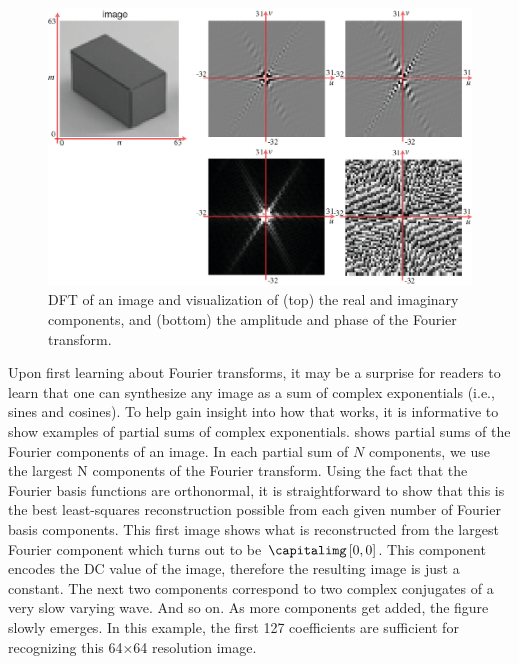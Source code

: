\begin{figure}[t]
	\centerline{
		\includegraphics[width=1\linewidth]{figures/Image_processing_fourier/dft_a.eps}
	}
	\caption{DFT of an image and visualization of (top) the real and imaginary components,
		and (bottom) the amplitude and phase  of the Fourier transform.}
	\label{fig:DFT_a}
\end{figure}

Upon first learning about Fourier transforms, it may be a surprise for readers to learn that one can synthesize any image as a sum of complex exponentials (i.e., sines and cosines).  To help gain insight into how that works, it is informative to show examples of partial sums of complex exponentials. \Fig{\ref{fig:DFT_b}} shows partial sums of the Fourier components
of an image.  In each partial sum of $N$ components, we use the largest N components of the Fourier transform.
Using the fact that the Fourier basis functions are orthonormal, it is straightforward to show that this is the best least-squares reconstruction possible from each given number of Fourier basis
components.  This first image shows what is reconstructed from the largest Fourier component which turns out to be $\capitalimg \left[0,0 \right]$. This component encodes the DC value of the image, therefore the resulting image is just a constant. The next two components correspond to two complex conjugates of a very slow varying wave. And so on. As more components get added, the figure slowly emerges. In this example, the first 127 coefficients are sufficient for recognizing this 64$\times$64 resolution image.


